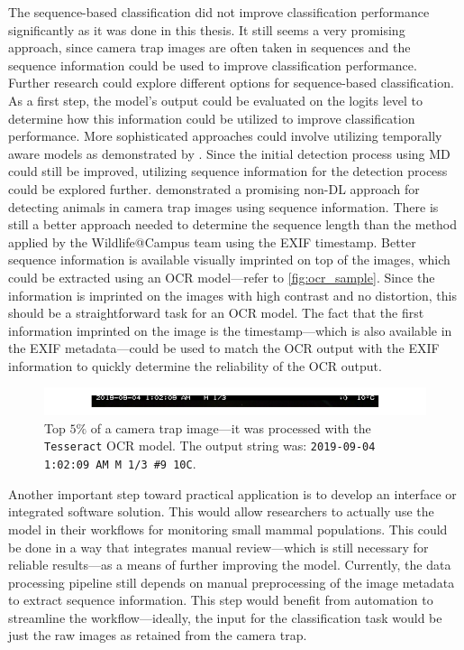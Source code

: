 The sequence-based classification did not improve classification performance significantly as it was done in this thesis.
It still seems a very promising approach, since camera trap images are often taken in sequences and the sequence information could be used to improve classification performance.
Further research could explore different options for sequence-based classification.
As a first step, the model's output could be evaluated on the logits level to determine how this information could be utilized to improve classification performance.
More sophisticated approaches could involve utilizing temporally aware models as demonstrated by \textcite{muhammadTemporalSwinFPNNetNovel2024}.
Since the initial detection process using \ac{MD} could still be improved, utilizing sequence information for the detection process could be explored further.
\textcite{zotinAnimalDetectionUsing2019} demonstrated a promising non-\ac{DL} approach for detecting animals in camera trap images using sequence information.
There is still a better approach needed to determine the sequence length than the method applied by the Wildlife@Campus team using the \ac{EXIF} timestamp.
Better sequence information is available visually imprinted on top of the images, which could be extracted using an \ac{OCR} model---refer to \autoref{fig:ocr_sample}.
Since the information is imprinted on the images with high contrast and no distortion, this should be a straightforward task for an \ac{OCR} model.
The fact that the first information imprinted on the image is the timestamp---which is also available in the \ac{EXIF} metadata---could be used to match the \ac{OCR} output with the \ac{EXIF} information to quickly determine the reliability of the \ac{OCR} output.

\begin{figure}[ht]
\centering
\includegraphics{figures/ocr_example.pdf}
\caption{Top \(5\%\) of a camera trap image---it was processed with the \texttt{Tesseract} \acs{OCR} model. The output string was: \texttt{2019-09-04 1:02:09 AM M 1/3 \#9 10\textdegree C}.}
\label{fig:ocr_sample}
\end{figure}

Another important step toward practical application is to develop an interface or integrated software solution.
This would allow researchers to actually use the model in their workflows for monitoring small mammal populations.
This could be done in a way that integrates manual review---which is still necessary for reliable results---as a means of further improving the model.
Currently, the data processing pipeline still depends on manual preprocessing of the image metadata to extract sequence information.
This step would benefit from automation to streamline the workflow---ideally, the input for the classification task would be just the raw images as retained from the camera trap.

